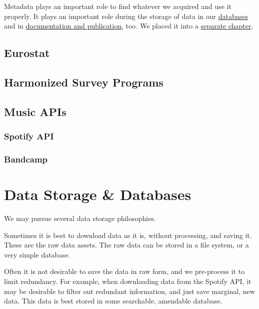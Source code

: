 \documentclass[
  fontsize=13pt,
  english,
  a4paper,
  openany, a4paper, oneside]{book}
\begin{document}
Metadata plays an important role to find whatever we acquired and use it properly. It plays an important role during the storage of data in our \protect\hyperlink{data-storage}{databases} and in \protect\hyperlink{documentation}{documentation and publication}, too. We placed it into a \protect\hyperlink{metadata}{separate chapter}.

\hypertarget{eurostat}{%
\section{Eurostat}\label{eurostat}}

\hypertarget{harmonized-survey-programs}{%
\section{Harmonized Survey Programs}\label{harmonized-survey-programs}}

\hypertarget{music-apis}{%
\section{Music APIs}\label{music-apis}}

\hypertarget{spotify-api}{%
\subsection{Spotify API}\label{spotify-api}}

\hypertarget{bandcamp}{%
\subsection{Bandcamp}\label{bandcamp}}

\hypertarget{data-storage}{%
\chapter{Data Storage \& Databases}\label{data-storage}}

We may pursue several data storage philosophies.

Sometimes it is best to download data as it is, without processing, and saving it. These are the raw data assets. The raw data can be stored in a file system, or a very simple database.

Often it is not desirable to save the data in raw form, and we pre-process it to limit redundancy. For example, when downloading data from the Spotify API, it may be desirable to filter out redundant information, and just save marginal, new data. This data is best stored in some searchable, amendable database.
\end{document}
